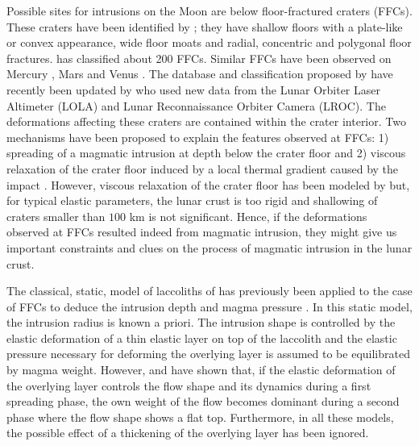   Possible sites for intrusions on  the Moon are below floor-fractured
  craters   (FFCs).    These   craters   have   been   identified   by
  \citet{Schultz:1976kt}; they  have shallow floors with  a plate-like
  or convex  appearance, wide floor  moats and radial,  concentric and
  polygonal  floor fractures.   \citet{Schultz:1976kt} has  classified
  about  200  FFCs.   Similar  FFCs  have  been  observed  on  Mercury
  \citep{Head:2008cm},                                            Mars
  \citep{Schultz:1978tw,Schultz:1979iw,Sato:2010ex}      and     Venus
  \citep{Wichman:1995ju}.  The database and classification proposed by
  \citet{Schultz:1976kt}    have    recently     been    updated    by
  \citet{Jozwiak:2012dq}  who used  new  data from  the Lunar  Orbiter
  Laser  Altimeter  (LOLA)  and Lunar  Reconnaissance  Orbiter  Camera
  (LROC).  The  deformations  affecting these  craters  are  contained
  within the  crater interior.  Two  mechanisms have been  proposed to
  explain the  features observed at  FFCs: 1) spreading of  a magmatic
  intrusion      at     depth      below     the      crater     floor
  \citep{Schultz:1976kt,Wichman:1993hk,Wichman:1995ic,Wichman:1996bj,Jozwiak:2012dq}
  and 2)  viscous relaxation of  the crater  floor induced by  a local
  thermal gradient caused by the impact \citep{Hall:1981kl}.  However,
  viscous  relaxation  of  the  crater   floor  has  been  modeled  by
  \citet{Dombard:2001gs}  but,  for  typical elastic  parameters,  the
  lunar  crust is  too rigid  and shallowing  of craters  smaller than
  $100$ km is not significant.  Hence, if the deformations observed at
  FFCs resulted  indeed from  magmatic intrusion,  they might  give us
  important constraints and clues on the process of magmatic intrusion
  in the lunar crust.
	
  The classical, static, model of laccoliths of \citet{Pollard:1973ho}
  has  previously been  applied  to the  case of  FFCs  to deduce  the
  intrusion          depth         and          magma         pressure
  \citep{Wichman:1993hk,Wichman:1996bj,Jozwiak:2012dq}.     In    this
  static model, the intrusion radius  is known a priori. The intrusion
  shape is  controlled by  the elastic deformation  of a  thin elastic
  layer on top of the laccolith and the elastic pressure necessary for
  deforming the overlying layer is assumed to be equilibrated by magma
  weight.   However, \citet{Michaut:2011kg}  and \citet{Bunger:2011cb}
  have shown that,  if the elastic deformation of  the overlying layer
  controls the  flow shape and  its dynamics during a  first spreading
  phase, the own  weight of the flow becomes dominant  during a second
  phase where  the flow shape shows  a flat top.  Furthermore,  in all
  these models, the  possible effect of a thickening  of the overlying
  layer has been ignored.
	

